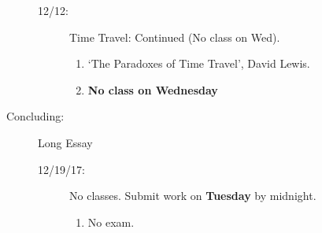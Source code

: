 \documentclass[article,oneside]{memoir}
\begin{document}
\begin{description}
\begin{description}
\item[12/12:] Time Travel: Continued (No class on Wed).
\begin{enumerate}
\item `The Paradoxes of Time Travel', David Lewis.
\item \textbf{No class on Wednesday}
\end{enumerate}

\end{description}

\item[Concluding:] Long Essay
\begin{description}
\item[12/19/17:] No classes. Submit work on \textbf{Tuesday} by midnight.
\begin{enumerate}
\item No exam.

\end{enumerate}
\end{description}
\end{description} 



\end{document}

